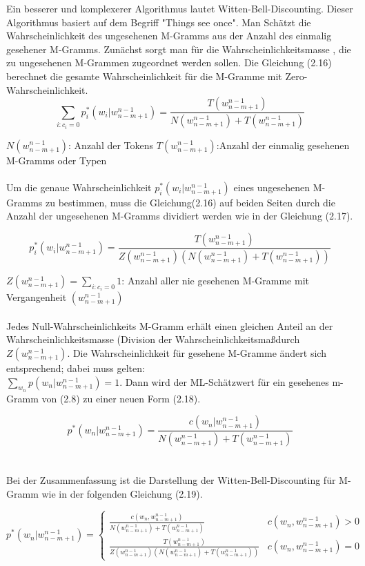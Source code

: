 Ein besserer und komplexerer Algorithmus lautet Witten-Bell-Discounting.
Dieser Algorithmus basiert auf dem Begriff "Things see once". Man Sch\"atzt die Wahrscheinlichkeit des ungesehenen M-Gramms aus der Anzahl des einmalig gesehener M-Gramms. Zun\"achst sorgt man f\"ur die Wahrscheinlichkeitsmasse , die zu ungesehenen M-Grammen zugeordnet werden sollen. Die Gleichung (2.16) berechnet die  gesamte Wahrscheinlichkeit f\"ur  die M-Gramme mit Zero-Wahrscheinlichkeit.
\begin{equation}
\label{equation:witten_bell_01}
\sum_{i:c_{i}=0}p_{i}^{*}(w_{i}|w_{n-m+1}^{n-1})=\frac{T(w_{n-m+1}^{n-1})}{N(w_{n-m+1}^{n-1})+T(w_{n-m+1}^{n-1})}
\end{equation}

$N(w_{n-m+1}^{n-1})$: Anzahl der Tokens
$T(w_{n-m+1}^{n-1})$:Anzahl der einmalig gesehenen M-Gramms oder Typen
\\
\\
Um die genaue Wahrscheinlichkeit $p_{i}^{*}(w_{i}|w_{n-m+1}^{n-1})$ eines ungesehenen M-Gramms zu bestimmen, muss die Gleichung(2.16) auf beiden Seiten durch die Anzahl der ungesehenen M-Gramms dividiert werden wie in der Gleichung (2.17).

\begin{equation}
\label{equation:witten_bell_02}
p_{i}^{*}(w_{i}|w_{n-m+1}^{n-1})=\frac{T(w_{n-m+1}^{n-1})}{Z(w_{n-m+1}^{n-1})(N(w_{n-m+1}^{n-1})+T(w_{n-m+1}^{n-1}))}
\end{equation}

$Z(w_{n-m+1}^{n-1})=\sum_{i:c_{i}=0}1$: Anzahl aller nie gesehenen M-Gramme mit Vergangenheit $(w_{n-m+1}^{n-1})$
\\
\\
Jedes Null-Wahrscheinlichkeits M-Gramm erh\"alt einen gleichen Anteil an der Wahrscheinlichkeitsmasse (Division der Wahrscheinlichkeitsma\ss durch $Z(w_{n-m+1}^{n-1})$.
Die Wahrscheinlichkeit f\"ur gesehene M-Gramme \"andert sich entsprechend; dabei muss gelten:\\ 
$\sum_{w_{n}}p(w_{n}|w_{n-m+1}^{n-1})=1$. Dann wird der ML-Sch\"atzwert  f\"ur ein gesehenes m-Gramm von (2.8) zu einer neuen Form (2.18). 

\begin{equation}
\label{equation:witten_bell_03}
p^{*}(w_{n}|w_{n-m+1}^{n-1})=\frac{c(w_{n}|w_{n-m+1}^{n-1})}{N(w_{n-m+1}^{n-1})+T(w_{n-m+1}^{n-1})}
\end{equation}
\\
\\
Bei der Zusammenfassung ist die Darstellung der Witten-Bell-Discounting f\"ur M-Gramm wie in der folgenden Gleichung (2.19).

\begin{equation}
\label{equationo:witten_bell_04}
p^{*}(w_{n}|w_{n-m+1}^{n-1})=\begin{cases}
\frac{c(w_{n},w_{n-m+1}^{n-1})}{N(w_{n-m+1}^{n-1})+T(w_{n-m+1}^{n-1})} & c(w_{n},w_{n-m+1}^{n-1})>0 \\
\frac{T(w_{n-m+1}^{n-1})}{Z(w_{n-m+1}^{n-1})(N(w_{n-m+1}^{n-1})+T(w_{n-m+1}^{n-1}))} & c(w_{n},w_{n-m+1}^{n-1})=0 
\end{cases}
\end{equation}
